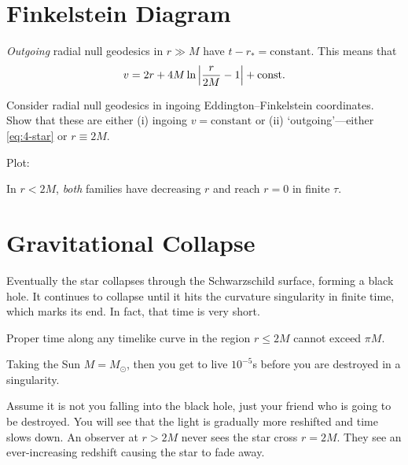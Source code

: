 
\section{Finkelstein Diagram}%
\label{sec:finkelstein_diagram}

\begin{definition}[]
  \emph{Outgoing} radial null geodesics in $r \gg M$ have $t - r_* = \text{constant}$. This means that
  \begin{equation}
    \label{eq:4-star}
    v= 2r + 4 M \ln \abs{\frac{r}{2M} - 1} + \text{const.}
  \end{equation}
\end{definition}

\begin{exercise}
  Consider radial null geodesics in ingoing Eddington--Finkelstein coordinates. Show that these are either (i) ingoing $v = \text{constant}$ or (ii) `outgoing'---either \eqref{eq:4-star} or $r \equiv 2 M$.
\end{exercise}

Plot:


In $r < 2M$, \emph{both} families have decreasing $r$ and reach $r = 0$ in finite $\tau$.

\section{Gravitational Collapse}%
\label{sec:gravitational_collapse}


Eventually the star collapses through the Schwarzschild surface, forming a black hole.
It continues to collapse until it hits the curvature singularity in finite time, which marks its end.
In fact, that time is very short.

\begin{exercise}[Sheet $1$]
  Proper time along any timelike curve in the region $r \leq 2M$ cannot exceed $\pi M$.
\end{exercise}

Taking the Sun $M = M_\odot$, then you get to live $10^{-5}$s before you are destroyed in a singularity.

Assume it is not you falling into the black hole, just your friend who is going to be destroyed. You will see that the light is gradually more reshifted and time slows down.
An observer at $r > 2M$ never sees the star cross  $r = 2M$. They see an ever-increasing redshift causing the star to fade away.

